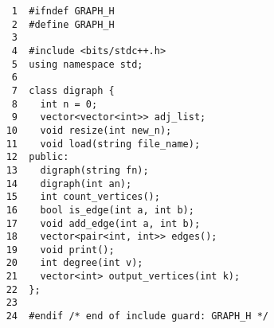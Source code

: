\begin{verbatim}
     1	#ifndef GRAPH_H
     2	#define GRAPH_H
     3	
     4	#include <bits/stdc++.h>
     5	using namespace std;
     6	
     7	class digraph {
     8	  int n = 0;
     9	  vector<vector<int>> adj_list;
    10	  void resize(int new_n);
    11	  void load(string file_name);
    12	public:
    13	  digraph(string fn);
    14	  digraph(int an);
    15	  int count_vertices();
    16	  bool is_edge(int a, int b);
    17	  void add_edge(int a, int b);
    18	  vector<pair<int, int>> edges();
    19	  void print();
    20	  int degree(int v);
    21	  vector<int> output_vertices(int k);
    22	};
    23	
    24	#endif /* end of include guard: GRAPH_H */
\end{verbatim}
